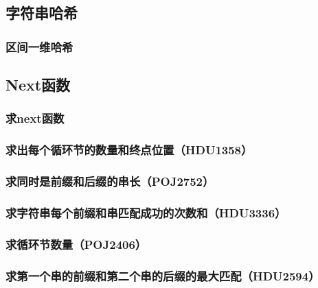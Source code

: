 \documentclass[landscape,twocolumn,twoside,a4paper]{article}
\begin{document}
\subsection{字符串哈希}
\subsubsection{区间一维哈希}

% 



\subsection{Next函数}

\subsubsection{求next函数}


\subsubsection{求出每个循环节的数量和终点位置（HDU1358）}


\subsubsection{求同时是前缀和后缀的串长（POJ2752）}


\subsubsection{求字符串每个前缀和串匹配成功的次数和（HDU3336）}


\subsubsection{求循环节数量（POJ2406）}


\subsubsection{求第一个串的前缀和第二个串的后缀的最大匹配（HDU2594）}

\end{document}
